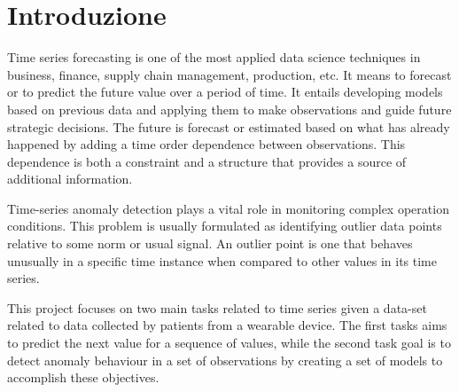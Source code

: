 \chapter*{Introduzione}
Time series forecasting is one of the most applied data science techniques in business, finance, supply chain management, production, etc. It means to forecast or to predict the future value over a period of time. It entails developing models based on previous data and applying them to make observations and guide future strategic decisions. The future is forecast or estimated based on what has already happened by adding a time order dependence between observations. This dependence is both a constraint and a structure that provides a source of additional information.

Time-series anomaly detection plays a vital role in monitoring complex operation conditions. This problem is usually formulated as identifying outlier data points relative to some norm or usual signal. An outlier point is one that behaves unusually in a specific time instance when compared to other values in its time series. 

This project focuses on two main tasks related to time series given a data-set related to data collected by patients from a wearable device. The first tasks aims to predict the next value for a sequence of values, while the second task goal is to detect anomaly behaviour in a set of observations by creating a set of models to accomplish these objectives.


